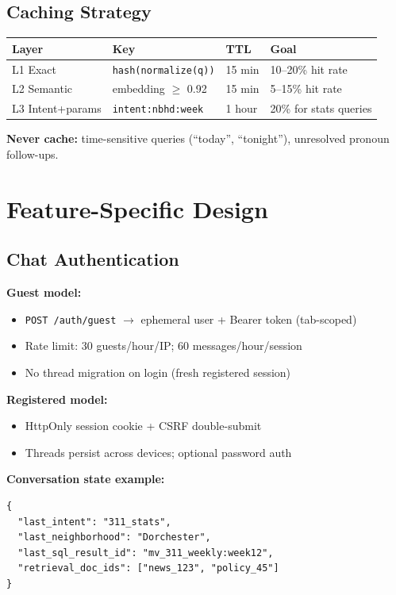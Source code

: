 \documentclass[11pt,a4paper]{article}
\begin{document}
\subsection{Caching Strategy}
\begin{table}[h]
\centering
\small
\begin{tabular}{@{}llll@{}}
\toprule
\textbf{Layer} & \textbf{Key} & \textbf{TTL} & \textbf{Goal} \\
\midrule
L1 Exact & \texttt{hash(normalize(q))} & 15 min & 10--20\% hit rate \\
L2 Semantic & embedding $\geq$ 0.92 & 15 min & 5--15\% hit rate \\
L3 Intent+params & \texttt{intent:nbhd:week} & 1 hour & 20\% for stats queries \\
\bottomrule
\end{tabular}
\end{table}

\textbf{Never cache:} time-sensitive queries (``today'', ``tonight''), unresolved pronoun follow-ups.

\section{Feature-Specific Design}

\subsection{Chat Authentication}
\textbf{Guest model:}
\begin{itemize}[noitemsep]
  \item \texttt{POST /auth/guest} $\rightarrow$ ephemeral user + Bearer token (tab-scoped)
  \item Rate limit: 30 guests/hour/IP; 60 messages/hour/session
  \item No thread migration on login (fresh registered session)
\end{itemize}

\textbf{Registered model:}
\begin{itemize}[noitemsep]
  \item HttpOnly session cookie + CSRF double-submit
  \item Threads persist across devices; optional password auth
\end{itemize}

\textbf{Conversation state example:}
\begin{lstlisting}
{
  "last_intent": "311_stats",
  "last_neighborhood": "Dorchester",
  "last_sql_result_id": "mv_311_weekly:week12",
  "retrieval_doc_ids": ["news_123", "policy_45"]
}
\end{lstlisting}
\end{document}
